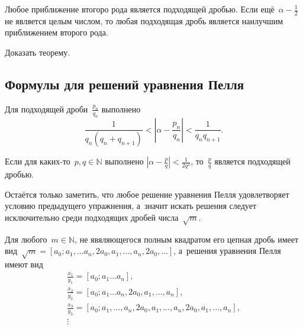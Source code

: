\documentclass{article}
\begin{document}
\begin{theorem}
  Любое приближение втогоро рода является подходящей дробью. Если ещё~$\alpha -
  \frac{1}{2}$ не является целым числом, то любая подходящая дробь является
  наилучшим приближением второго рода.
\end{theorem}

\begin{exercise}
  Доказать теорему.
\end{exercise}

\subsection{Формулы для решений уравнения Пелля}

\begin{exercise}
  Для подходящей дроби~$\frac{p_n}{q_n}$ выполнено
  $$ \frac{1}{q_n (q_n + q_{n+1})} < \left| \alpha - \frac{p_n}{q_n} \right| <
  \frac{1}{q_n q_{n+1}}. $$
\end{exercise}

\begin{exercise}
  Если для каких-то~$p, q \in \mathbb{N}$ выполнено $\left| \alpha - \frac{p}{q}
  \right| < \frac{1}{2q^2}$, то~$\frac{p}{q}$ является подходящей дробью.
\end{exercise}

Остаётся только заметить, что любое решение уравнения Пелля удовлетворяет
условию предыдущего упражнения, а~значит искать решения следует исключительно
среди подходящих дробей числа~$\sqrt{m}$.

\begin{exercise}
  Для любого~$m \in \mathbb{N}$, не явяляющегося полным квадратом его цепная
  дробь имеет вид~$\sqrt{m} = [a_0; a_1, \ldots a_n, 2a_0, a_1, \ldots, a_n,
  2a_0, \ldots]$, а~решения уравнения Пелля имеют вид
  \begin{gather*}
    \frac{x_1}{y_1} =
    [a_0; a_1 \ldots a_n],\\
    \frac{x_2}{y_2} =
    [a_0; a_1 \ldots a_n, 2a_0, a_1, \ldots, a_n],\\
    \frac{x_3}{y_3} =
    [a_0; a_1, \ldots, a_n, 2a_0, a_1, \ldots, a_n, 2a_0, a_1, \ldots, a_n],\\
    \vdots
  \end{gather*}
\end{exercise}
\end{document}
